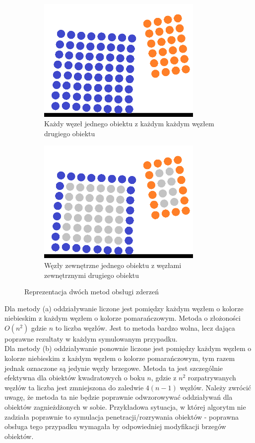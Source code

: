 \documentclass[12pt, letterpaper]{report}
\begin{document}
    \begin{figure}[h]
        \centering
        \begin{subfigure}[t]{0.4\textwidth}
            \includegraphics[width=\textwidth, height=6cm]{objects_unoptimized} 
            \caption{Każdy węzeł jednego obiektu z każdym każdym węzłem drugiego obiektu}
        \end{subfigure}
        \begin{subfigure}[t]{0.4\textwidth}
            \includegraphics[width=\textwidth, height=6cm]{objects_optimized}
            \caption{Węzły zewnętrzne jednego obiektu z węzłami zewnętrznymi drugiego obiektu}
        \end{subfigure}
        \caption{Reprezentacja dwóch metod obsługi zderzeń}
    \end{figure}

    Dla metody (a) oddziaływanie liczone jest pomiędzy każdym węzłem o kolorze niebieskim z każdym węzłem o
    kolorze pomarańczowym. Metoda o złożoności $O(n^2)$ gdzie $n$ to liczba węzłów.
    Jest to metoda bardzo wolna, lecz dająca poprawne rezultaty w każdym symulowanym przypadku.\\

    Dla metody (b) oddziaływanie ponownie liczone jest pomiędzy każdym węzłem o kolorze niebieskim z każdym
    węzłem o kolorze pomarańczowym, tym razem jednak oznaczone są jedynie węzły brzegowe.
    Metoda ta jest szczególnie efektywna dla obiektów kwadratowych o boku $n$, gdzie z $n^2$
    rozpatrywanych węzłów ta liczba jest zmniejszona do zaledwie $4(n-1)$ węzłów.
    Należy zwrócić uwagę, że metoda ta nie będzie poprawnie odwzorowywać oddziaływań dla
    obiektów zagnieżdżonych w sobie. Przykładowa sytuacja, w której algorytm nie zadziała poprawnie
    to symulacja penetracji/rozrywania obiektów - poprawna obsługa tego przypadku wymagała by odpowiedniej
    modyfikacji brzegów obiektów.
\end{document}
